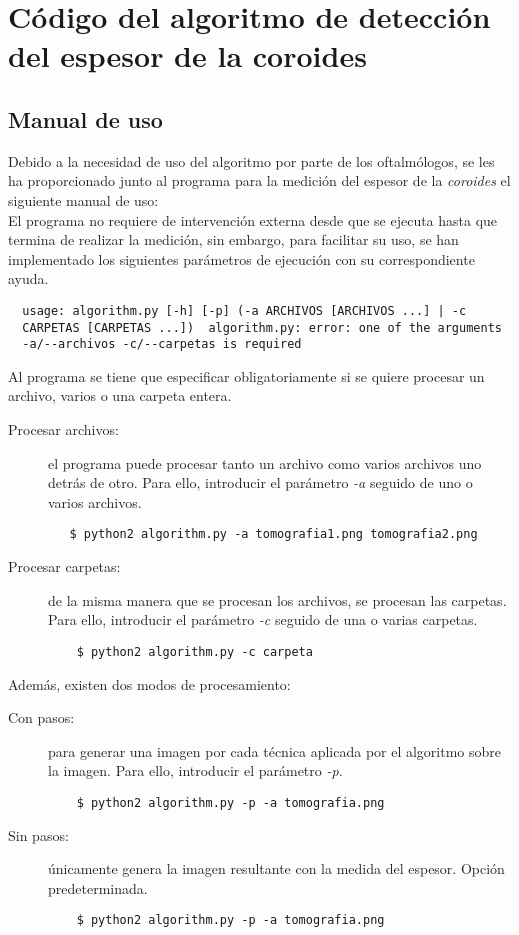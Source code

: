 \chapter{Código del algoritmo de detección del espesor de la coroides}
\section{Manual de uso}
Debido a la necesidad de uso del algoritmo por parte de los
oftalmólogos, se les ha proporcionado junto al programa para la
medición del espesor de la \emph{\gls{coroides}} el siguiente manual de uso:\\
El programa no requiere de intervención externa desde que se ejecuta
hasta que termina de realizar la medición, sin embargo, para facilitar
su uso, se han implementado los siguientes parámetros de ejecución con
su correspondiente ayuda.
\begin{verbatim}
  usage: algorithm.py [-h] [-p] (-a ARCHIVOS [ARCHIVOS ...] | -c
  CARPETAS [CARPETAS ...])  algorithm.py: error: one of the arguments
  -a/--archivos -c/--carpetas is required
\end{verbatim}

Al programa se tiene que especificar obligatoriamente si se
quiere procesar un archivo, varios o una carpeta entera.
\begin{description}
\item[Procesar archivos:] el programa puede procesar tanto un archivo
  como varios archivos uno detrás de otro. Para ello, introducir el
  parámetro \emph{-a} seguido de uno o varios archivos.
 \begin{verbatim}
   $ python2 algorithm.py -a tomografia1.png tomografia2.png
  \end{verbatim}
\item[Procesar carpetas:] de la misma manera que se procesan los
  archivos, se procesan las carpetas. Para ello, introducir el
  parámetro \emph{-c} seguido de una o varias carpetas.
 \begin{verbatim}
    $ python2 algorithm.py -c carpeta
  \end{verbatim}
\end{description}

Además, existen dos modos de procesamiento:
\begin{description}
\item[Con pasos:] para generar una imagen por cada técnica aplicada
  por el algoritmo sobre la imagen. Para ello, introducir el parámetro
  \emph{-p}.
  \begin{verbatim}
    $ python2 algorithm.py -p -a tomografia.png
  \end{verbatim}
\item[Sin pasos:] únicamente genera la imagen resultante con la medida
  del espesor. Opción predeterminada.
  \begin{verbatim}
    $ python2 algorithm.py -p -a tomografia.png
  \end{verbatim}
\end{description}


